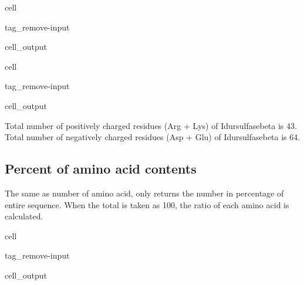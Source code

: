 \documentclass[letterpaper,10pt,english]{jupyterBook}
\begin{document}
\begin{sphinxuseclass}{cell}
\begin{sphinxuseclass}{tag_remove-input}\begin{sphinxVerbatimOutput}

\begin{sphinxuseclass}{cell_output}
\noindent{}

\end{sphinxuseclass}\end{sphinxVerbatimOutput}

\end{sphinxuseclass}
\end{sphinxuseclass}
\begin{sphinxuseclass}{cell}
\begin{sphinxuseclass}{tag_remove-input}\begin{sphinxVerbatimOutput}

\begin{sphinxuseclass}{cell_output}
\begin{sphinxVerbatim}[commandchars=\\\{\}]
Total number of positively charged residues (Arg + Lys) of Idursulfasebeta is 43.
Total number of negatively charged residues (Asp + Glu) of Idursulfasebeta is 64.
\end{sphinxVerbatim}

\end{sphinxuseclass}\end{sphinxVerbatimOutput}

\end{sphinxuseclass}
\end{sphinxuseclass}

\subsection{Percent of amino acid contents}
\label{\detokenize{ipynb/chapter1:percent-of-amino-acid-contents}}
\sphinxAtStartPar
The same as number of amino acid, only returns the number in percentage of entire sequence. When the total is taken as 100, the ratio of each amino acid is calculated.

\begin{sphinxuseclass}{cell}
\begin{sphinxuseclass}{tag_remove-input}\begin{sphinxVerbatimOutput}

\begin{sphinxuseclass}{cell_output}
\noindent{}

\end{sphinxuseclass}\end{sphinxVerbatimOutput}

\end{sphinxuseclass}
\end{sphinxuseclass}
\end{document}
